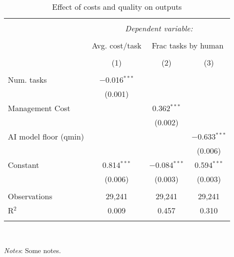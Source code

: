 
\begin{table}[!htbp] \centering 
  \caption{Effect of costs and quality on outputs} 
  \label{tab:outcomes} 
\footnotesize 
\begin{tabular}{@{\extracolsep{-6pt}}lccc} 
\\[-1.8ex]\hline 
\hline \\[-1.8ex] 
 & \multicolumn{3}{c}{\textit{Dependent variable:}} \\ 
\cline{2-4} 
\\[-1.8ex] & Avg. cost/task & \multicolumn{2}{c}{Frac tasks by human} \\ 
\\[-1.8ex] & (1) & (2) & (3)\\ 
\hline \\[-1.8ex] 
 Num. tasks & $-$0.016$^{***}$ &  &  \\ 
  & (0.001) &  &  \\ 
  Management Cost &  & 0.362$^{***}$ &  \\ 
  &  & (0.002) &  \\ 
  AI model floor (qmin) &  &  & $-$0.633$^{***}$ \\ 
  &  &  & (0.006) \\ 
  Constant & 0.814$^{***}$ & $-$0.084$^{***}$ & 0.594$^{***}$ \\ 
  & (0.006) & (0.003) & (0.003) \\ 
 \hline \\[-1.8ex] 
Observations & 29,241 & 29,241 & 29,241 \\ 
R$^{2}$ & 0.009 & 0.457 & 0.310 \\ 
\hline 
\hline \\[-1.8ex] 
\end{tabular}
\\
\begin{minipage}{ \textwidth}
{\footnotesize \emph{Notes}: Some notes.}
\end{minipage}
\end{table}

